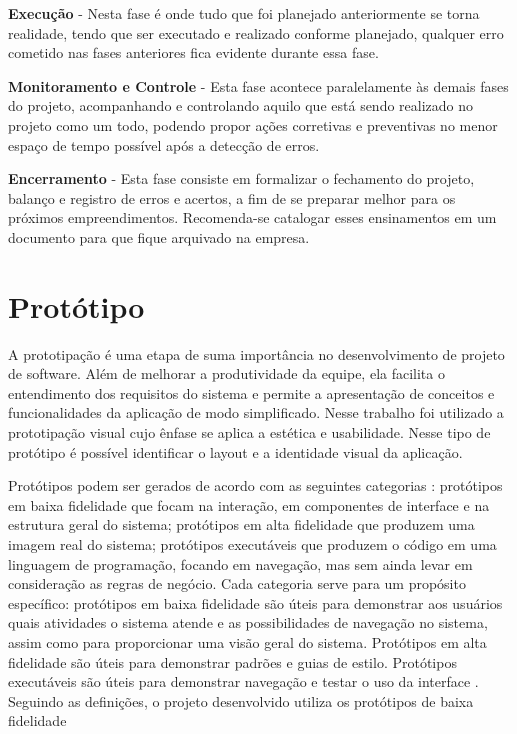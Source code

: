 \textbf{Execução} - Nesta fase é onde tudo que foi planejado anteriormente se torna realidade, tendo que ser executado e realizado conforme planejado, qualquer erro cometido nas fases anteriores fica evidente durante essa fase.

\textbf{Monitoramento e Controle} - Esta fase acontece paralelamente às demais fases do projeto, acompanhando e controlando aquilo que está sendo realizado no projeto como um todo, podendo propor ações corretivas e preventivas no menor espaço de tempo possível após a detecção de erros.

\textbf{Encerramento} - Esta fase consiste em formalizar o fechamento do projeto, balanço e registro de erros e acertos, a fim de se preparar melhor para os próximos empreendimentos. Recomenda-se catalogar esses ensinamentos em um documento para que fique arquivado na empresa.

\section{Protótipo}

A prototipação é uma etapa de suma importância no desenvolvimento de projeto de software. Além de melhorar a produtividade da equipe, ela facilita o entendimento dos requisitos do sistema e permite a apresentação de conceitos e funcionalidades da aplicação de modo simplificado.
Nesse trabalho foi utilizado a prototipação visual cujo ênfase se aplica a estética e usabilidade. Nesse tipo de protótipo é possível identificar o layout e a identidade visual da aplicação. \cite{dextra2013prototipacao}

{Protótipos podem ser gerados de acordo com as seguintes categorias \cite{coyette2004sketchixml}: protótipos em baixa fidelidade que focam na interação, em componentes de interface e na estrutura geral do sistema; protótipos em alta fidelidade que produzem uma imagem real do sistema; protótipos executáveis que produzem o código em uma linguagem de programação, focando em navegação, mas sem ainda levar em consideração as regras de negócio. Cada categoria serve para um propósito específico: protótipos em baixa fidelidade são úteis para demonstrar aos usuários quais atividades o sistema atende e as possibilidades de navegação no sistema, assim como para proporcionar uma visão geral do sistema. Protótipos em alta fidelidade são úteis para demonstrar padrões e guias de estilo. Protótipos executáveis são úteis para demonstrar navegação e testar o uso da interface \cite{rosemberg2008prototipaccao}. Seguindo as definições, o projeto desenvolvido utiliza os protótipos de baixa fidelidade}

